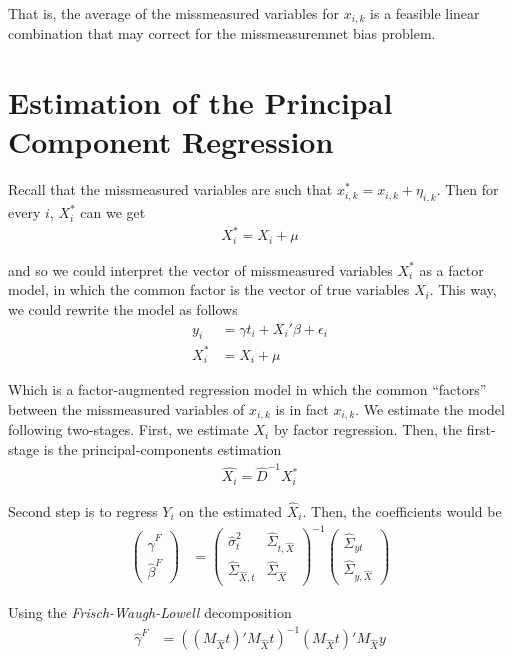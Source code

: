 \documentclass[12pt]{article}
\def\g{\gamma}
\begin{document}
That is, the average of the missmeasured variables for $x_{i,k}$ is a feasible linear combination that may correct for the missmeasuremnet bias problem.

\section*{Estimation of the Principal Component Regression}

Recall that the missmeasured variables are such that $x^*_{i,k}=x_{i,k}+\eta_{i,k}$. Then for every $i$, $X_i^*$ can we get
\begin{align}
    X_i^* = X_i +\mu
\end{align}

and so we could interpret the vector of missmeasured variables $X^*_i$ as a factor model, in which the common factor is the vector of true variables $X_i$. This way, we could rewrite the model as follows
\begin{align}
    y_i &= \gamma t_i + X_i'\beta + \epsilon_i \\
    X_i^* &= X_i +\mu
\end{align}

Which is a factor-augmented regression model in which the common ``factors'' between the missmeasured variables of $x_{i,k}$ is in fact $x_{i,k}$. We estimate the model following two-stages. First, we estimate $X_i$ by factor regression. Then, the first-stage is the principal-components estimation
\begin{align}
    \hat{X_i}=\hat{D}^{-1}X_i^*
\end{align}

Second step is to regress $Y_i$ on the estimated $\hat X_i$. Then, the coefficients would be
\begin{align}
    \left(\begin{array}{l}
\hat{\gamma}^{F} \\
\hat{\beta}^{F}
\end{array}\right)&=\left(\begin{array}{cc}
\hat{\sigma}^2_{t} & \hat\Sigma_{t,\hat X} \\
\hat \Sigma_{\hat X,t} & \hat {\Sigma}_{\hat X}
\end{array}\right)^{-1}\left(\begin{array}{c}
\hat \Sigma_{yt} \\
\hat \Sigma_{y,\hat X}
\end{array}\right)
\end{align}

Using the \textit{Frisch-Waugh-Lowell} decomposition
\begin{align}
    \hat{\g}^F & = ((M_{\hat{X}}t)'M_{\hat{X}}t)^{-1}(M_{\hat{X}}t)'M_{\hat{X}}y
\end{align}
\end{document}
